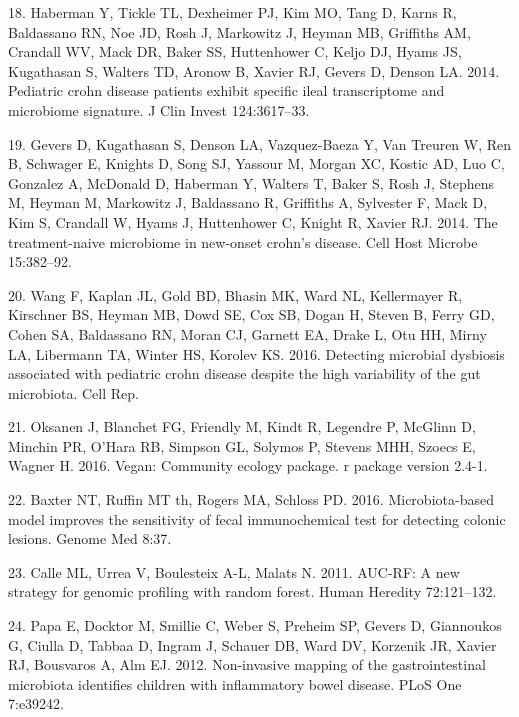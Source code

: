 \documentclass[11pt,]{article}
\begin{document}
\hypertarget{ref-haberman_pedsCD_2014}{}
18. Haberman Y, Tickle TL, Dexheimer PJ, Kim MO, Tang D, Karns R,
Baldassano RN, Noe JD, Rosh J, Markowitz J, Heyman MB, Griffiths AM,
Crandall WV, Mack DR, Baker SS, Huttenhower C, Keljo DJ, Hyams JS,
Kugathasan S, Walters TD, Aronow B, Xavier RJ, Gevers D, Denson LA.
2014. Pediatric crohn disease patients exhibit specific ileal
transcriptome and microbiome signature. J Clin Invest 124:3617--33.

\hypertarget{ref-gevers_pedsCD_2014}{}
19. Gevers D, Kugathasan S, Denson LA, Vazquez-Baeza Y, Van Treuren W,
Ren B, Schwager E, Knights D, Song SJ, Yassour M, Morgan XC, Kostic AD,
Luo C, Gonzalez A, McDonald D, Haberman Y, Walters T, Baker S, Rosh J,
Stephens M, Heyman M, Markowitz J, Baldassano R, Griffiths A, Sylvester
F, Mack D, Kim S, Crandall W, Hyams J, Huttenhower C, Knight R, Xavier
RJ. 2014. The treatment-naive microbiome in new-onset crohn's disease.
Cell Host Microbe 15:382--92.

\hypertarget{ref-wang_pedsCD_2016}{}
20. Wang F, Kaplan JL, Gold BD, Bhasin MK, Ward NL, Kellermayer R,
Kirschner BS, Heyman MB, Dowd SE, Cox SB, Dogan H, Steven B, Ferry GD,
Cohen SA, Baldassano RN, Moran CJ, Garnett EA, Drake L, Otu HH, Mirny
LA, Libermann TA, Winter HS, Korolev KS. 2016. Detecting microbial
dysbiosis associated with pediatric crohn disease despite the high
variability of the gut microbiota. Cell Rep.

\hypertarget{ref-oksanen_vegan_2016}{}
21. Oksanen J, Blanchet FG, Friendly M, Kindt R, Legendre P, McGlinn D,
Minchin PR, O'Hara RB, Simpson GL, Solymos P, Stevens MHH, Szoecs E,
Wagner H. 2016. Vegan: Community ecology package. r package version
2.4-1.

\hypertarget{ref-baxter_FIT_2016}{}
22. Baxter NT, Ruffin MT th, Rogers MA, Schloss PD. 2016.
Microbiota-based model improves the sensitivity of fecal immunochemical
test for detecting colonic lesions. Genome Med 8:37.

\hypertarget{ref-calle_aucrf_2011}{}
23. Calle ML, Urrea V, Boulesteix A-L, Malats N. 2011. AUC-RF: A new
strategy for genomic profiling with random forest. Human Heredity
72:121--132.

\hypertarget{ref-papa_pedsIBD_2012}{}
24. Papa E, Docktor M, Smillie C, Weber S, Preheim SP, Gevers D,
Giannoukos G, Ciulla D, Tabbaa D, Ingram J, Schauer DB, Ward DV,
Korzenik JR, Xavier RJ, Bousvaros A, Alm EJ. 2012. Non-invasive mapping
of the gastrointestinal microbiota identifies children with inflammatory
bowel disease. PLoS One 7:e39242.
\end{document}
